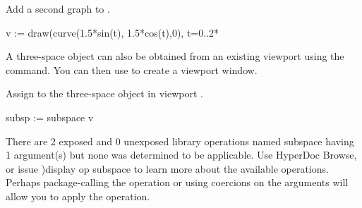 %
%
\begin{psXtc}
\begin{xtccomment}
Add a second graph to .
\end{xtccomment}
\begin{spadsrc}
v := draw(curve(1.5*sin(t), 1.5*cos(t),0), t=0..2*%
\end{spadsrc}
\end{psXtc}
%
A three-space object can also be obtained from an existing \threedim{} viewport
using the  command.
You can then use  to create a viewport window.
\begin{noOutputXtc}
\begin{xtccomment}
Assign to  the three-space object in viewport .
\end{xtccomment}
\begin{spadsrc}
subsp := subspace v 
\end{spadsrc}
\begin{MessageOutput}
   There are 2 exposed and 0 unexposed library operations named 
      subspace having 1 argument(s) but none was determined to be 
      applicable. Use HyperDoc Browse, or issue
                            )display op subspace
      to learn more about the available operations. Perhaps 
      package-calling the operation or using coercions on the arguments
      will allow you to apply the operation.
\end{MessageOutput}
\end{noOutputXtc}
